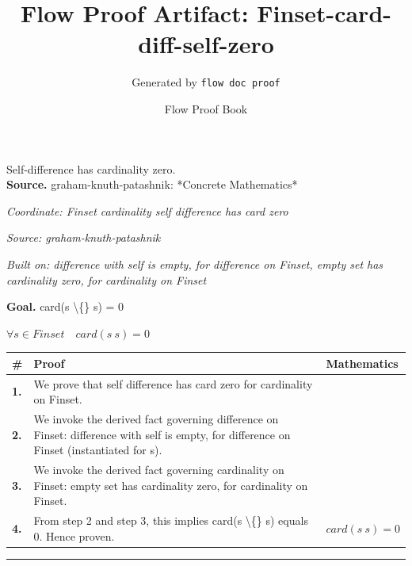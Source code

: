 \documentclass[11pt]{article}
\title{Flow Proof Artifact: Finset-card-diff-self-zero}
\author{Generated by \texttt{flow doc proof}}
\date{Flow Proof Book}
\theoremstyle{definition}
\begin{document}
\maketitle
Self-difference has cardinality zero.\\[0.5em]
\textbf{Source.} graham-knuth-patashnik: *Concrete Mathematics*\\[0.5em]
\bigskip
{}\par
\smallskip\noindent\textit{Coordinate: Finset \cdot cardinality \cdot self difference has card zero}\par
\smallskip\noindent\textit{Source: graham-knuth-patashnik}\par
\smallskip\noindent\textit{Built on: difference with self is empty, for difference on Finset, empty set has cardinality zero, for cardinality on Finset}\par
\medskip
\noindent\textbf{Goal.} card(s \textbackslash\{\} s) = 0\par
\noindent$\displaystyle \forall s \in Finset\quad card(s \ s) = 0$\par
\medskip
\noindent
\begin{tabular}{@{} >{\raggedright\arraybackslash}p{} >{\raggedright\arraybackslash}p{} >{\raggedleft\arraybackslash}p{} @{}}
\textbf{\#} & \textbf{Proof} & \textbf{Mathematics} \\
\midrule
\textbf{1.} & We prove that self difference has card zero for cardinality on Finset. & \\[0.45em]
\textbf{2.} & We invoke the derived fact governing difference on Finset: difference with self is empty, for difference on Finset (instantiated for s). & \\[0.45em]
\textbf{3.} & We invoke the derived fact governing cardinality on Finset: empty set has cardinality zero, for cardinality on Finset. & \\[0.45em]
\textbf{4.} & From step 2 and step 3, this implies card(s \textbackslash\{\} s) equals 0. Hence proven. & $\displaystyle card(s \ s) = 0$ \\[0.45em]
\bottomrule
\end{tabular}
\label{thm:Finset-cardinality-self_difference_has_card_zero}
\par\medskip\hrule
\end{document}
